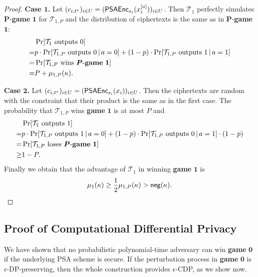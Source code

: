 \documentclass[10pt]{extarticle}
\begin{document}
\begin{proof}
\noindent\textbf{Case $\boldsymbol 1$.} Let $(c_{i,t^*})_{i\in U}=(\text{\upshape\sffamily PSAEnc}_{s_i}(x_i^{[a]}))_{i\in U}$. Then $\mathcal{T}_1$ perfectly simulates $\boldsymbol P$-\textbf{game} $\boldsymbol 1$ for $\mathcal{T}_{1,P}$ and the distribution of ciphertexts is the same as in $\boldsymbol P$-\textbf{game} $\boldsymbol 1$:
\begin{align*} & \Pr[\mathcal{T}_1 \text{ outputs } 0]\\
 = & p\cdot \Pr[\mathcal{T}_{1,P} \text{ outputs } 0 \,|\, a=0]+(1-p)\cdot\Pr[\mathcal{T}_{1,P} \text{ outputs } 1 \,|\, a=1]\\
 = & \Pr[\mathcal{T}_{1,P} \text{ wins } \boldsymbol P\text{-\textbf{game} } \boldsymbol 1]\\
 = & P + \mu_{1,P}(\kappa).
\end{align*}\par\medskip

\noindent\textbf{Case $\boldsymbol 2$.} Let $(c_{i,t^*})_{i\in U}=(\text{\upshape\sffamily PSAEnc}_{s_i}(x_i))_{i\in U}$. Then the ciphertexts are random with the constraint 
that their product is the same as in the first case. The probability that $\mathcal{T}_{1,P}$ wins \textbf{game} $\boldsymbol 1$ is at most $P$ and
\begin{align*} & \Pr[\mathcal{T}_1 \text{ outputs } 1]\\
 = & p\cdot\Pr[\mathcal{T}_{1,P} \text{ outputs } 1 \,|\, a=0]+(1-p)\cdot\Pr[\mathcal{T}_{1,P} \text{ outputs } 0 \,|\, a=1]\cdot (1-p)\\
 = & \Pr[\mathcal{T}_{1,P} \text{ loses } \boldsymbol P\text{-\textbf{game} } \boldsymbol 1]\\
 \geq & 1-P.
\end{align*}
Finally we obtain that the advantage of $\mathcal{T}_1$ in winning \textbf{game} $\boldsymbol 1$ is
\[\mu_{1}(\kappa)\geq\frac{1}{2}\mu_{1,P}(\kappa)>\text{\upshape\sffamily neg}(\kappa).\]
\end{proof}


\subsection{Proof of Computational Differential Privacy}

We have shown that no probabilistic polynomial-time adversary can win \textbf{game} $\boldsymbol 0$ if the underlying PSA scheme is secure. If the perturbation process in \textbf{game} $\boldsymbol 0$ is $\epsilon$-{\sffamily DP}-preserv\-ing, then the whole construction provides $\epsilon$-{\sffamily CDP}, as we show now.
\end{document}
